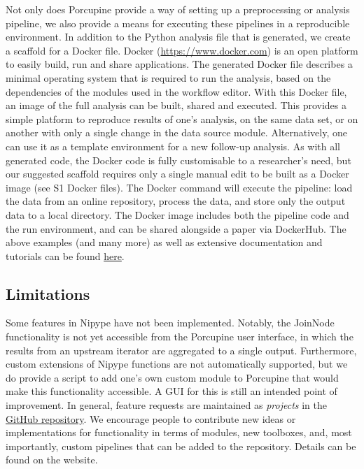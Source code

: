 Not only does Porcupine provide a way of setting up a preprocessing  or analysis pipeline, we also provide a means for executing these pipelines in a reproducible environment. In addition to the Python analysis file that is generated, we create a scaffold for a Docker file. Docker (\url{https://www.docker.com}) is an open platform to easily build, run and share applications. The generated Docker file describes a minimal operating system that is required to run the analysis, based on the dependencies of the modules used in the workflow editor. With this Docker file, an image of the full analysis can be built, shared and executed. This provides a simple platform to reproduce results of one's analysis, on the same data set, or on another with only a single change in the data source module. Alternatively, one can use it as a template environment for a new follow-up analysis. As with all generated code, the Docker code is fully customisable to a researcher's need, but our suggested scaffold requires only a single manual edit to be built as a Docker image (see S1 Docker files). The Docker command will execute the pipeline: load the data from an online repository, process the data, and store only the output data to a local directory. The Docker image includes both the pipeline code and the run environment, and can be shared alongside a paper via DockerHub. The above examples (and many more) as well as extensive documentation and tutorials can be found \href{https://timvanmourik.github.io/Porcupine}{here}.

\subsection{Limitations}
Some features in Nipype have not been implemented. Notably, the JoinNode functionality is not yet accessible from the Porcupine user interface, in which the results from an upstream iterator are aggregated to a single output. Furthermore, custom extensions of Nipype functions are not automatically supported, but we do provide a script to add one's own custom module to Porcupine that would make this functionality accessible. A GUI for this is still an intended point of improvement. In general, feature requests are maintained as  \emph{projects} in the \href{https://github.com/TimVanMourik/Porcupine/projects}{GitHub repository}. We encourage people to contribute new ideas or implementations for functionality in terms of modules, new toolboxes, and, most importantly, custom pipelines that can be added to the repository. Details  can be found on the website.

